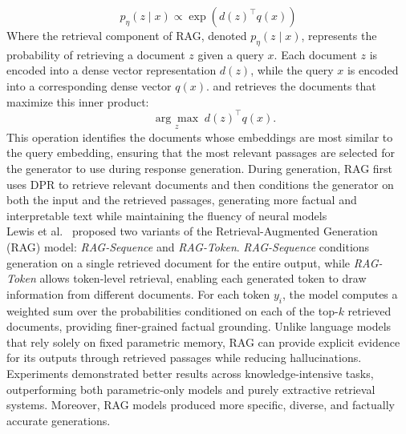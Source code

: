 \documentclass[conference]{IEEEtran}
\begin{document}
\[
    p_{\eta}(z \mid x) \propto \exp \left( d(z)^\top q(x) \right)
\]
Where the retrieval component of RAG, denoted \( p_{\eta}(z \mid x) \), represents the probability of retrieving a document \( z \) given a query \( x \). Each document \( z \) is encoded into a dense vector representation \( d(z) \), while the query \( x \) is encoded into a corresponding dense vector \( q(x) \). 
and retrieves the documents that maximize this inner product:
\[
\quad \underset{z}{\arg\max} \; d(z)^\top q(x).
\]
This operation identifies the documents whose embeddings are most similar to the query embedding, ensuring that the most relevant passages are selected for the generator to use during response generation.
\noindent
During generation, RAG first uses DPR \cite{karpukhin2020dense_passage_retrieval} to retrieve relevant documents and then conditions the generator \cite{lewis2019bart} on both the input and the retrieved passages, generating more factual and interpretable text while maintaining the fluency of neural models \\
Lewis et al.~\cite{lewis2020rag} proposed two variants of the Retrieval-Augmented Generation (RAG) model: \textit{RAG-Sequence} and \textit{RAG-Token}. \textit{RAG-Sequence} conditions generation on a single retrieved document for the entire output, while \textit{RAG-Token} allows token-level retrieval, enabling each generated token to draw information from different documents. For each token $y_i$, the model computes a weighted sum over the probabilities conditioned on each of the top-$k$ retrieved documents, providing finer-grained factual grounding. Unlike language models that rely solely on fixed parametric memory, RAG can provide explicit evidence for its outputs through retrieved passages while reducing hallucinations. Experiments \cite{lewis2020rag} demonstrated better results across knowledge-intensive tasks, outperforming both parametric-only models and purely extractive retrieval systems. Moreover, RAG models produced more specific, diverse, and factually accurate generations.
\end{document}
